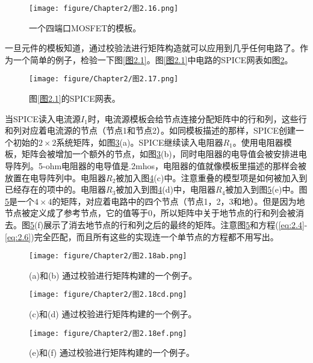 \begin{figure}[htbp]
\small
    \centering
    \texttt{[image: figure/Chapter2/图2.16.png]}
    \caption{一个四端口MOSFET的模板。}
    \label{图2.16}
\end{figure}

一旦元件的模板知道，通过校验法进行矩阵构造就可以应用到几乎任何电路了。作为一个简单的例子，检验一下图\ref{图2.1}。图\ref{图2.1}中电路的SPICE网表如图\ref{图2.17}。
\begin{figure}[htbp]
\small
    \centering
    \texttt{[image: figure/Chapter2/图2.17.png]}
    \caption{图\ref{图2.1}的SPICE网表。}
    \label{图2.17}
\end{figure}

当SPICE读入电流源$I_1$时，电流源模板会给节点连接分配矩阵中的行和列，这些行和列对应着电流源的节点（节点1和节点2）。如同模板描述的那样，SPICE创建一个初始的$2\times2$系统矩阵，如图\ref{图2.18ab}(a)。SPICE继续读入电阻器$R_1$。使用电阻器模板，矩阵会被增加一个额外的节点，如图\ref{图2.18ab}(b)，同时电阻器的电导值会被安排进电导阵列。5-ohm电阻器的电导值是.2mhos，电阻器的值就像模板里描述的那样会被放置在电导阵列中。电阻器$R_2$被加入图\ref{图2.18cd}(c)中。注意重叠的模型项是如何被加入到已经存在的项中的。电阻器$R_3$被加入到图\ref{图2.18cd}(d)中，电阻器$R_4$被加入到图\ref{图2.18ef}(e)中。图\ref{图2.18ef}是一个$4\times4$的矩阵，对应着电路中的四个节点（节点1，2，3和地）。但是因为地节点被定义成了参考节点，它的值等于0，所以矩阵中关于地节点的行和列会被消去。图\ref{图2.18ef}(f)展示了消去地节点的行和列之后的最终的矩阵。注意图\ref{图2.18ef}和方程(\ref{eq:2.4}-\ref{eq:2.6})完全匹配，而且所有这些的实现连一个单节点的方程都不用写出。
\begin{figure}[htbp]
\small
    \centering
    \texttt{[image: figure/Chapter2/图2.18ab.png]}
    \caption{(a)和(b) 通过校验进行矩阵构建的一个例子。}
    \label{图2.18ab}
\end{figure}

\begin{figure}[htbp]
\small
    \centering
    \texttt{[image: figure/Chapter2/图2.18cd.png]}
    \caption{(c)和(d) 通过校验进行矩阵构建的一个例子。}
    \label{图2.18cd}
\end{figure}

\begin{figure}[htbp]
\small
    \centering
    \texttt{[image: figure/Chapter2/图2.18ef.png]}
    \caption{(e)和(f) 通过校验进行矩阵构建的一个例子。}
    \label{图2.18ef}
\end{figure}

